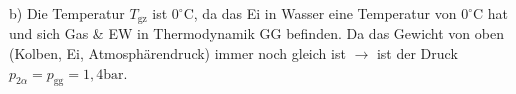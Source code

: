 b) Die Temperatur $T_{\text{gz}}$ ist $0^\circ \text{C}$, da das Ei in Wasser eine Temperatur von $0^\circ \text{C}$ hat und sich Gas \& EW in Thermodynamik GG befinden. Da das Gewicht von oben (Kolben, Ei, Atmosphärendruck) immer noch gleich ist $\rightarrow$ ist der Druck $p_{2\alpha} = p_{\text{gg}} = 1,4 \text{bar}$.